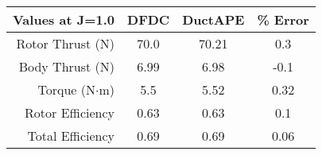         \begin{tabular}{ r | c | c | c }
            Values at J=1.0 & DFDC & DuctAPE & \% Error \\
            \hline
            Rotor Thrust (N) & 70.0 & 70.21 & 0.3 \\
            Body Thrust (N) & 6.99 & 6.98 & -0.1 \\
            Torque (N\(\cdot\)m) & 5.5 & 5.52 & 0.32 \\
            Rotor Efficiency & 0.63 & 0.63 & 0.1 \\
            Total Efficiency & 0.69 & 0.69 & 0.06 \\
        \end{tabular}
